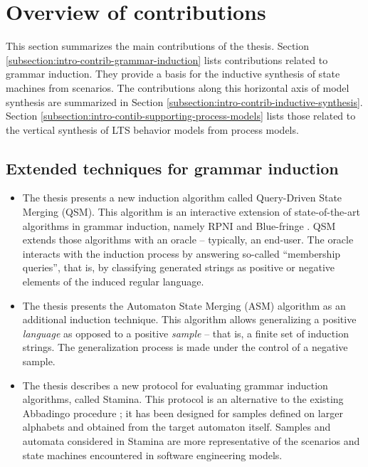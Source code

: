 \section{Overview of contributions\label{section:intro-contributions}}

This section summarizes the main contributions of the thesis. Section \ref{subsection:intro-contrib-grammar-induction} lists contributions related to grammar induction. They provide a basis for the inductive synthesis of state machines from scenarios. The contributions along this horizontal axis of model synthesis are summarized in Section \ref{subsection:intro-contrib-inductive-synthesis}. Section \ref{subsection:intro-contib-supporting-process-models} lists those related to the vertical synthesis of LTS behavior models from process models.


\subsection{Extended techniques for grammar induction\label{subsection:intro-contrib-grammar-induction}}

\begin{itemize}
\item The thesis presents a new induction algorithm called Query-Driven State Merging (QSM). This algorithm is an interactive extension of state-of-the-art algorithms in grammar induction, namely RPNI and Blue-fringe \cite{Oncina:1992, Lang:1998}. QSM extends those algorithms with an oracle -- typically, an end-user. The oracle interacts with the induction process by answering so-called ``membership queries'', that is, by classifying generated strings as positive or negative elements of the induced regular language.
\item The thesis presents the Automaton State Merging (ASM) algorithm as an additional induction technique. This algorithm allows generalizing a positive \emph{language} as opposed to a positive \emph{sample} -- that is, a finite set of induction strings. The generalization process is made under the control of a negative sample.
\item The thesis describes a new protocol for evaluating grammar induction algorithms, called Stamina. This protocol is an alternative to the existing Abbadingo procedure \cite{Lang:1998}; it has been designed for samples defined on larger alphabets and obtained from the target automaton itself. Samples and automata considered in Stamina are more representative of the scenarios and state machines encountered in software engineering models.
\end{itemize}


